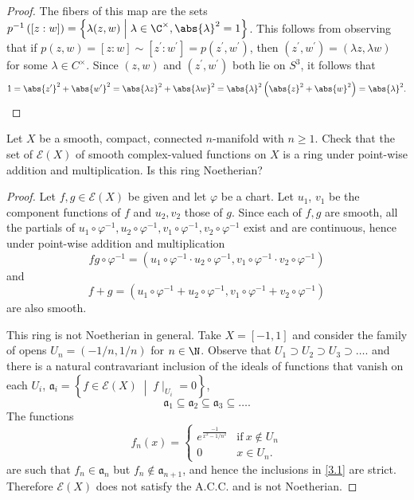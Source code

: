 \documentclass[10pt]{amsart}
\begin{document}
\begin{thm}
\begin{proof}
    The fibers of this map are the sets $p^{-1}\left([z : w]\right) = \left\{\lambda(z,w) \;\middle\vert\; \lambda \in \C^\times, \abs{\lambda}^2 = 1\right\}$.
    This follows from observing that if $p(z,w) = [z : w] \sim [z^\prime : w^\prime] = p(z^\prime, w^\prime)$, then $(z^\prime, w^\prime) = (\lambda z, \lambda w)$ for some $\lambda \in C^\times$.
    Since $(z,w)$ and $(z^\prime, w^\prime)$ both lie on $S^3$, it follows that 
    $$1 = \abs{z^\prime}^2 + \abs{w^\prime}^2 = \abs{\lambda z}^2 + \abs{\lambda w}^2 = \abs{\lambda}^2\left(\abs{z}^2 + \abs{w}^2\right) = \abs{\lambda}^2.$$
  \end{proof}
\end{thm}

\begin{thm}
  Let $X$ be a smooth, compact, connected $n$-manifold with $n \geq 1$.
  Check that the set of $\mathcal{E}(X)$ of smooth complex-valued functions on $X$ is a ring under point-wise addition and multiplication.
  Is this ring Noetherian?

  \begin{proof}
    Let $f, g \in \mathcal{E}(X)$ be given and let $\varphi$ be a chart.
    Let $u_1$, $v_1$ be the component functions of $f$ and $u_2, v_2$ those of $g$.
    Since each of $f, g$ are smooth, all the partials of $u_1 \circ \varphi^{-1}, u_2 \circ \varphi^{-1}, v_1 \circ \varphi^{-1}, v_2 \circ \varphi^{-1}$ exist and are continuous, hence under point-wise addition and multiplication
    $$fg \circ \varphi^{-1} = (u_1 \circ \varphi^{-1} \cdot u_2 \circ  \varphi^{-1}, v_1 \circ \varphi^{-1} \cdot v_2 \circ  \varphi^{-1})$$
    and
    $$f + g = (u_1 \circ \varphi^{-1} + u_2 \circ \varphi^{-1}, v_1 \circ \varphi^{-1} + v_2 \circ \varphi^{-1})$$
    are also smooth.

    This ring is not Noetherian in general.
    Take $X = [-1,1]$ and consider the family of opens $U_n = (-1/n, 1/n)$ for $n \in \N$.
    Observe that $U_1 \supset U_2 \supset U_3 \supset \ldots$. and there is a natural contravariant inclusion of the ideals of functions that vanish on each $U_i$, $\mathfrak{a}_i = \left\{ f \in \mathcal{E}(X) \;\middle\vert\; f\mid_{U_i} = 0 \right\}$,
    \begin{equation}\label{3.1}
      \mathfrak{a}_1 \subseteq \mathfrak{a}_2 \subseteq \mathfrak{a}_3 \subseteq \ldots.
    \end{equation}
    The functions
    $$f_n(x) = \left\{
    \begin{array}{ll}
      e^{\frac{-1}{x^2 - 1/n^2}} & \text{if}\ x \not \in U_n\\
      0 & x \in U_n.
    \end{array}
    \right.
    $$
    are such that $f_n \in \mathfrak{a}_n$ but $f_n \not \in \mathfrak{a}_{n+1}$, and hence the inclusions in \ref{3.1} are strict.
    Therefore $\mathcal{E}(X)$ does not satisfy the A.C.C. and is not Noetherian.
  \end{proof}
\end{thm}
\end{document}
